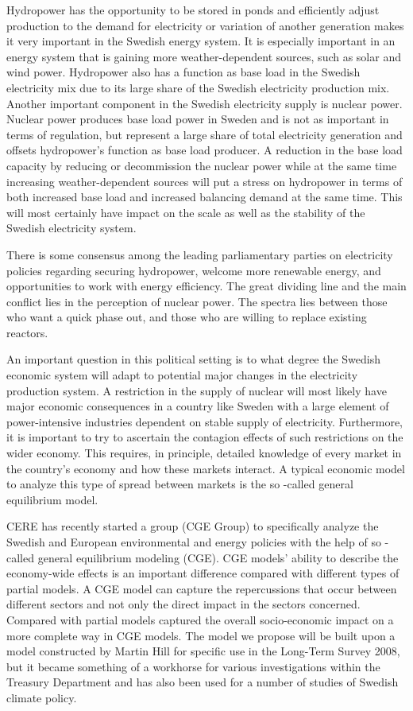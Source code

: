 \documentclass[10pt,a4paper]{article}
\begin{document}
Hydropower has the opportunity to be stored in ponds and efficiently adjust production to the demand for electricity or variation of another generation makes it very important in the Swedish energy system. It is especially important in an energy system that is gaining more weather-dependent sources, such as solar and wind power. Hydropower also has a function as base load in the Swedish electricity mix due to its large share of the Swedish electricity production mix. Another important component in the Swedish electricity supply is nuclear power. Nuclear power produces base load power in Sweden and is not as important in terms of regulation, but represent a large share of total electricity generation and offsets hydropower's function as base load producer. A reduction in the base load capacity by reducing or decommission the nuclear power while at the same time increasing weather-dependent sources will put a stress on hydropower in terms of both increased base load and increased balancing demand at the same time. This will most certainly have impact on the scale as well as the stability of the Swedish electricity system.

There is some consensus among the leading parliamentary parties on electricity policies regarding securing hydropower, welcome more renewable energy, and opportunities to work with energy efficiency. The great dividing line and the main conflict lies in the perception of nuclear power. The spectra lies between those who want a quick phase out, and those who are willing to replace existing reactors.

An important question in this political setting is to what degree the Swedish economic system will adapt to potential major changes in the electricity production system. A restriction in the supply of nuclear will most likely have major economic consequences in a country like Sweden with a large element of power-intensive industries dependent on stable supply of electricity. Furthermore, it is important to try to ascertain the contagion effects of such restrictions on the wider economy. This requires, in principle, detailed knowledge of every market in the country's economy and how these markets interact. A typical economic model to analyze this type of spread between markets is the so -called general equilibrium model.

CERE has recently started a group (CGE Group) to specifically analyze the Swedish and European environmental and energy policies with the help of so -called general equilibrium modeling (CGE). CGE models' ability to describe the economy-wide effects is an important difference compared with different types of partial models. A CGE model can capture the repercussions that occur between different sectors and not only the direct impact in the sectors concerned. Compared with partial models captured the overall socio-economic impact on a more complete way in CGE models. The model we propose will be built upon a model constructed by Martin Hill for specific use in the Long-Term Survey 2008, but it became something of a workhorse for various investigations within the Treasury Department and has also been used for a number of studies of Swedish climate policy.
\end{document}
